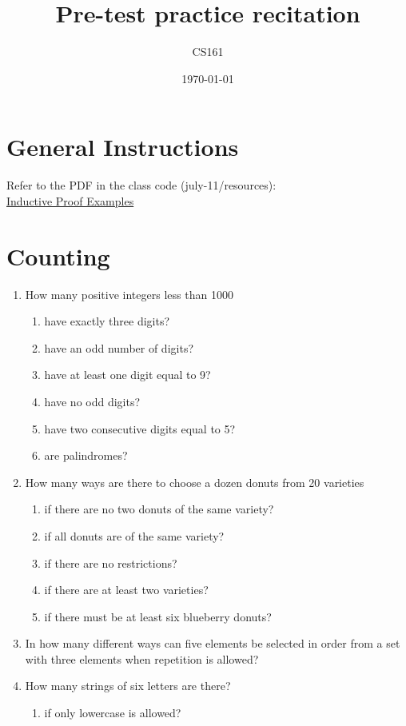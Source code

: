 \documentclass{article}
\title{Pre-test practice recitation}
\date{\today}
\author{CS161}
\begin{document}
\maketitle


\section{General Instructions}
Refer to the PDF in the class code (july-11/resources): \\
\href{https://github.com/csu161/Class-code/blob/master/july-11/resources/inductive-proof-examples.pdf}{Inductive Proof Examples}


\section{Counting}
\begin{enumerate}
\item How many positive integers less than 1000
  \begin{enumerate}
  \item have exactly three digits?
  \item have an odd number of digits?
  \item have at least one digit equal to 9?
  \item have no odd digits?
  \item have two consecutive digits equal to 5?
  \item are palindromes?
  \end{enumerate}
\item How many ways are there to choose a dozen donuts from 20 varieties
  \begin{enumerate}
  \item if there are no two donuts of the same variety?
  \item if all donuts are of the same variety?
  \item if there are no restrictions?
  \item if there are at least two varieties?
  \item if there must be at least six blueberry donuts?
  \end{enumerate}
\item In how many different ways can five elements be selected in order from a set with three elements when repetition is allowed?
\item How many strings of six letters are there?
  \begin{enumerate}
  \item if only lowercase is allowed?

\end{enumerate}
\end{enumerate}
\end{document}
